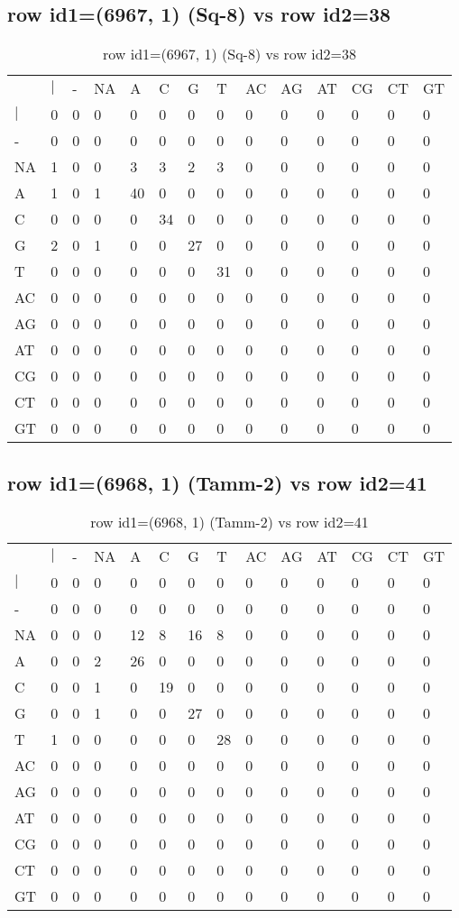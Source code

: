 \subsection{row id1=(6967, 1) (Sq-8) vs row id2=38}
\begin{center}
\begin{longtable}{|l|l|l|l|l|l|l|l|l|l|l|l|l|l|}
\caption{row id1=(6967, 1) (Sq-8) vs row id2=38} \label{table_dm176}\\
\hline
\\
\hline
&$|$&-&NA&A&C&G&T&AC&AG&AT&CG&CT&GT\\
$|$&0&0&0&0&0&0&0&0&0&0&0&0&0\\
-&0&0&0&0&0&0&0&0&0&0&0&0&0\\
NA&1&0&0&3&3&2&3&0&0&0&0&0&0\\
A&1&0&1&40&0&0&0&0&0&0&0&0&0\\
C&0&0&0&0&34&0&0&0&0&0&0&0&0\\
G&2&0&1&0&0&27&0&0&0&0&0&0&0\\
T&0&0&0&0&0&0&31&0&0&0&0&0&0\\
AC&0&0&0&0&0&0&0&0&0&0&0&0&0\\
AG&0&0&0&0&0&0&0&0&0&0&0&0&0\\
AT&0&0&0&0&0&0&0&0&0&0&0&0&0\\
CG&0&0&0&0&0&0&0&0&0&0&0&0&0\\
CT&0&0&0&0&0&0&0&0&0&0&0&0&0\\
GT&0&0&0&0&0&0&0&0&0&0&0&0&0\\
\hline
\end{longtable}
\end{center}

\subsection{row id1=(6968, 1) (Tamm-2) vs row id2=41}
\begin{center}
\begin{longtable}{|l|l|l|l|l|l|l|l|l|l|l|l|l|l|}
\caption{row id1=(6968, 1) (Tamm-2) vs row id2=41} \label{table_dm178}\\
\hline
\\
\hline
&$|$&-&NA&A&C&G&T&AC&AG&AT&CG&CT&GT\\
$|$&0&0&0&0&0&0&0&0&0&0&0&0&0\\
-&0&0&0&0&0&0&0&0&0&0&0&0&0\\
NA&0&0&0&12&8&16&8&0&0&0&0&0&0\\
A&0&0&2&26&0&0&0&0&0&0&0&0&0\\
C&0&0&1&0&19&0&0&0&0&0&0&0&0\\
G&0&0&1&0&0&27&0&0&0&0&0&0&0\\
T&1&0&0&0&0&0&28&0&0&0&0&0&0\\
AC&0&0&0&0&0&0&0&0&0&0&0&0&0\\
AG&0&0&0&0&0&0&0&0&0&0&0&0&0\\
AT&0&0&0&0&0&0&0&0&0&0&0&0&0\\
CG&0&0&0&0&0&0&0&0&0&0&0&0&0\\
CT&0&0&0&0&0&0&0&0&0&0&0&0&0\\
GT&0&0&0&0&0&0&0&0&0&0&0&0&0\\
\hline
\end{longtable}
\end{center}

